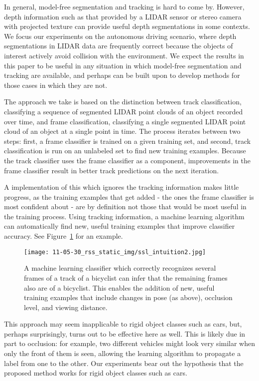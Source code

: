 \documentclass[conference]{IEEEtran}
\begin{document}
In general, model-free segmentation and tracking is hard to come by.  However, depth information such as that provided by a LIDAR sensor or stereo camera with projected texture can provide useful depth segmentations in some contexts.  We focus our experiments on the autonomous driving scenario, where depth segmentations in LIDAR data are frequently correct because the objects of interest actively avoid collision with the environment.  We expect the results in this paper to be useful in any situation in which model-free segmentation and tracking are available, and perhaps can be built upon to develop methods for those cases in which they are not.

The approach we take is based on the distinction between track classification, \ie classifying a sequence of segmented LIDAR point clouds of an object recorded over time, and frame classification, \ie classifying a single segmented LIDAR point cloud of an object at a single point in time.  The process iterates between two steps: first, a frame classifier is trained on a given training set, and second, track classification is run on an unlabeled set to find new training examples.  Because the track classifier uses the frame classifier as a component, improvements in the frame classifier result in better track predictions on the next iteration.

A \naive implementation of this which ignores the tracking information makes little progress, as the training examples that get added - the ones the frame classifier is most confident about - are by definition not those that would be most useful in the training process.  Using tracking information, a machine learning algorithm can automatically find new, useful training examples that improve classifier accuracy.  See Figure~\ref{fig:ssl_intuition} for an example.

\begin{figure}
  \centering
  \texttt{[image: 11-05-30\_rss\_static\_img/ssl\_intuition2.jpg]}
  \caption{A machine learning classifier which correctly recognizes several frames of a track of a bicyclist can infer that the remaining frames also are of a bicyclist.  This enables the addition of new, useful training examples that include changes in pose (as above), occlusion level, and viewing distance.}
  \label{fig:ssl_intuition}
\end{figure}

This approach may seem inapplicable to rigid object classes such as cars, but, perhaps surprisingly, turns out to be effective here as well. This is likely due in part to occlusion: for example, two different vehicles might look very similar when only the front of them is seen, allowing the learning algorithm to propagate a label from one to the other.  Our experiments bear out the hypothesis that the proposed method works for rigid object classes such as cars.
\end{document}
